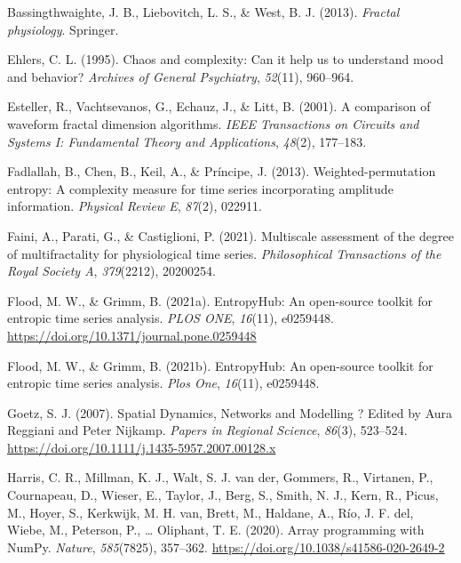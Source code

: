 \documentclass[
  man]{apa6}
\newlength{\cslhangindent}
\newlength{\cslentryspacingunit} %
\newenvironment{CSLReferences}[2] %
 {%
  \setlength{\parindent}{0pt}
  \ifodd #1
  \let\oldpar\par
  \def\par{\hangindent=\cslhangindent\oldpar}
  \fi
  \setlength{\parskip}{#2\cslentryspacingunit}
 }%
 {}
\begin{document}
\hypertarget{refs}{}
\begin{CSLReferences}{1}{0}
\leavevmode{}%
Bassingthwaighte, J. B., Liebovitch, L. S., \& West, B. J. (2013). \emph{Fractal physiology}. Springer.

\leavevmode{}%
Ehlers, C. L. (1995). Chaos and complexity: Can it help us to understand mood and behavior? \emph{Archives of General Psychiatry}, \emph{52}(11), 960--964.

\leavevmode{}%
Esteller, R., Vachtsevanos, G., Echauz, J., \& Litt, B. (2001). A comparison of waveform fractal dimension algorithms. \emph{IEEE Transactions on Circuits and Systems I: Fundamental Theory and Applications}, \emph{48}(2), 177--183.

\leavevmode{}%
Fadlallah, B., Chen, B., Keil, A., \& Príncipe, J. (2013). Weighted-permutation entropy: A complexity measure for time series incorporating amplitude information. \emph{Physical Review E}, \emph{87}(2), 022911.

\leavevmode{}%
Faini, A., Parati, G., \& Castiglioni, P. (2021). Multiscale assessment of the degree of multifractality for physiological time series. \emph{Philosophical Transactions of the Royal Society A}, \emph{379}(2212), 20200254.

\leavevmode{}%
Flood, M. W., \& Grimm, B. (2021a). EntropyHub: An open-source toolkit for entropic time series analysis. \emph{PLOS ONE}, \emph{16}(11), e0259448. \url{https://doi.org/10.1371/journal.pone.0259448}

\leavevmode{}%
Flood, M. W., \& Grimm, B. (2021b). EntropyHub: An open-source toolkit for entropic time series analysis. \emph{Plos One}, \emph{16}(11), e0259448.

\leavevmode{}%
Goetz, S. J. (2007). Spatial Dynamics, Networks and Modelling ? Edited by Aura Reggiani and Peter Nijkamp. \emph{Papers in Regional Science}, \emph{86}(3), 523--524. \url{https://doi.org/10.1111/j.1435-5957.2007.00128.x}

\leavevmode{}%
Harris, C. R., Millman, K. J., Walt, S. J. van der, Gommers, R., Virtanen, P., Cournapeau, D., Wieser, E., Taylor, J., Berg, S., Smith, N. J., Kern, R., Picus, M., Hoyer, S., Kerkwijk, M. H. van, Brett, M., Haldane, A., Río, J. F. del, Wiebe, M., Peterson, P., \ldots{} Oliphant, T. E. (2020). Array programming with {NumPy}. \emph{Nature}, \emph{585}(7825), 357--362. \url{https://doi.org/10.1038/s41586-020-2649-2}


\end{CSLReferences}
\end{document}
